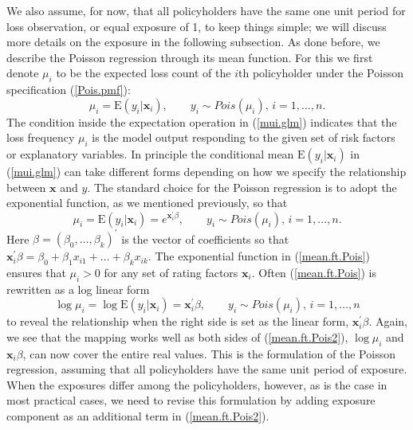 \documentclass[12pt]{article}
\def\E{\mathrm{E}}
\begin{document}
We also assume, for now, that all policyholders have the same one unit period for loss observation, or equal exposure of 1, to keep things simple; we will discuss more details on the exposure in the following subsection. 
As done before, we describe the Poisson regression through its mean function. For this we first denote $\mu_i$ to be the expected loss count of the $i$th policyholder under the Poisson specification (\ref{Pois.pmf}): 
\begin{equation}
\label{mui.glm}
\mu_i=\E(y_i|\mathbf{ x}_i), \qquad y_i \sim Pois(\mu_i), \, i=1, \ldots, n.
\end{equation} 
The condition inside the expectation operation in (\ref{mui.glm}) indicates that the loss frequency $\mu_i$ is the model output responding to the given set of risk factors or explanatory variables. 
In principle the conditional mean $\E(y_i|\mathbf{ x}_i)$ in (\ref{mui.glm}) can take different forms depending on how we specify the relationship between $\mathbf{ x}$ and $y$. The standard choice for the Poisson regression is to adopt the exponential function, as we mentioned previously, so that
\begin{equation}
\label{mean.ft.Pois}
\mu_i=\E(y_i|\mathbf{ x}_i)=e^{\mathbf{ x}^{\prime}_i\beta}, \qquad y_i \sim Pois(\mu_i), \, i=1, \ldots, n.
\end{equation} 
Here $\beta=(\beta_0, \ldots, \beta_k)^{\prime}$ is the vector of coefficients so that $\mathbf{ x}^{\prime}_i\beta=\beta_0+\beta_1x_{i1} +\ldots+\beta_k x_{ik}$. 
The exponential function in (\ref{mean.ft.Pois}) ensures that $\mu_i >0$ for any set of rating factors $\mathbf{ x}_i$. Often (\ref{mean.ft.Pois}) is rewritten as a log linear form
\begin{equation}
\label{mean.ft.Pois2}
\log \mu_i=\log \E(y_i|\mathbf{ x}_i)=\mathbf{ x}^{\prime}_i\beta, \qquad y_i \sim Pois(\mu_i), \, i=1, \ldots, n
\end{equation} to reveal the relationship when the right side is set as the linear form, $\mathbf{ x}^{\prime}_i\beta$. Again, we see that the  mapping works well as both sides of (\ref{mean.ft.Pois2}), $\log \mu_i$ and $\mathbf{ x}_i\beta$, can now cover the entire real values. 
This is the formulation of the Poisson regression, assuming that all policyholders have the same unit period of exposure. When the exposures differ among the policyholders, however, as is the case in most practical cases, we need to revise this formulation by adding  exposure component as an additional term in (\ref{mean.ft.Pois2}).
\end{document}
